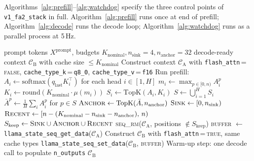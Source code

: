\documentclass[sigconf, anonymous=false, screen=true]{acmart}
\begin{document}
Algorithms~\ref{alg:prefill}--\ref{alg:watchdog} specify the three control points of \texttt{v1\_fa2\_stack} in full. Algorithm~\ref{alg:prefill} runs once at end of prefill; Algorithm~\ref{alg:decode} runs the decode loop; Algorithm~\ref{alg:watchdog} runs as a parallel process at 5\,Hz.

\begin{algorithm}[t]
\caption{\texttt{v1\_fa2\_stack} prefill (Controllers~1, 2, 4)}
\label{alg:prefill}
\begin{algorithmic}[1]
\Require prompt tokens $X^{\text{prompt}}$, budgets $K_{\text{nominal}}, n_{\text{sink}}{=}4, n_{\text{anchor}}{=}32$
\Ensure decode-ready context $\mathcal{C}_{\text{B}}$ with cache size $\le K_{\text{nominal}}$
\State Construct context $\mathcal{C}_{\text{A}}$ with \texttt{flash\_attn}\,=\,\textsc{false}, \texttt{cache\_type\_k}\,=\,\texttt{q8\_0}, \texttt{cache\_type\_v}\,=\,\texttt{f16}
\State Run prefill: $A_i \gets \mathrm{softmax}(q_{\text{last}} K_i^\top)$ for each head $i \in [1, H]$ 
  \State $m_i \gets \max_{p \in [0,n)} A_i^p$
  \State $K_i \gets \mathrm{round}(K_{\text{nominal}} \cdot \mu(m_i))$ 
  \State $S_i \gets \mathrm{TopK}(A_i, K_i)$ 
\EndFor
\State $S \gets \bigcup_{i=1}^{H} S_i$ 
\State $\bar{A}^p \gets \tfrac{1}{H}\sum_i A_i^p$ for $p \in S$ 
\State $\textsc{Anchor} \gets \mathrm{TopK}(\bar{A}, n_{\text{anchor}})$ 
\State $\textsc{Sink} \gets [0, n_{\text{sink}})$ 
\State $\textsc{Recent} \gets [n - (K_{\text{nominal}} - n_{\text{sink}} - n_{\text{anchor}}),\, n)$
\State $S_{\text{keep}} \gets \textsc{Sink} \cup \textsc{Anchor} \cup \textsc{Recent}$
\State \textsc{seq\_rm}($\mathcal{C}_{\text{A}}$, positions $\notin S_{\text{keep}}$) 
\State \textsc{buffer} $\gets$ \texttt{llama\_state\_seq\_get\_data}($\mathcal{C}_{\text{A}}$) 
\State Construct $\mathcal{C}_{\text{B}}$ with \texttt{flash\_attn}\,=\,\textsc{true}, same cache types
\State \texttt{llama\_state\_seq\_set\_data}($\mathcal{C}_{\text{B}}$, \textsc{buffer})
\State Warm-up step: one decode call to populate \texttt{n\_outputs}
\State \Return $\mathcal{C}_{\text{B}}$
\end{algorithmic}
\end{algorithm}
\end{document}
